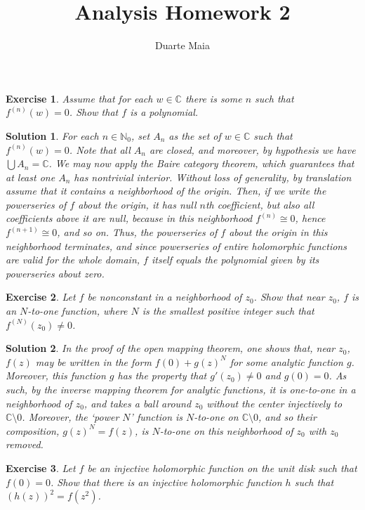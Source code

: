 \documentclass{article}
\title{Analysis Homework 2}
\author{Duarte Maia}
\newtheorem{ex}{Exercise}
\theoremstyle{nonumberplain}
\newtheorem{sol}{Solution}
\newcommand{\C}{\mathbb{C}}
\newcommand{\N}{\mathbb{N}}
\begin{document}
\maketitle

\begin{ex}
Assume that for each $w \in \C$ there is some $n$ such that $f^{(n)}(w) = 0$. Show that $f$ is a polynomial.
\end{ex}

\begin{sol}
For each $n \in \N_0$, set $A_n$ as the set of $w \in \C$ such that $f^{(n)}(w) = 0$. Note that all $A_n$ are closed, and moreover, by hypothesis we have $\bigcup A_n = \C$. We may now apply the Baire category theorem, which guarantees that at least one $A_n$ has nontrivial interior. Without loss of generality, by translation assume that it contains a neighborhood of the origin. Then, if we write the powerseries of $f$ about the origin, it has null $n$th coefficient, but also all coefficients above it are null, because in this neighborhood $f^{(n)} \cong 0$, hence $f^{(n+1)} \cong 0$, and so on. Thus, the powerseries of $f$ about the origin in this neighborhood terminates, and since powerseries of entire holomorphic functions are valid for the whole domain, $f$ itself equals the polynomial given by its powerseries about zero.
\end{sol}

\begin{ex}
Let $f$ be nonconstant in a neighborhood of $z_0$. Show that near $z_0$, $f$ is an $N$-to-one function, where $N$ is the smallest positive integer such that $f^{(N)}(z_0) \neq 0$.
\end{ex}

\begin{sol}
In the proof of the open mapping theorem, one shows that, near $z_0$, $f(z)$ may be written in the form $f(0) + g(z)^N$ for some analytic function $g$. Moreover, this function $g$ has the property that $g'(z_0) \neq 0$ and $g(0) = 0$. As such, by the inverse mapping theorem for analytic functions, it is one-to-one in a neighborhood of $z_0$, and takes a ball around $z_0$ without the center injectively to $\C \setminus 0$. Moreover, the `power $N$' function is $N$-to-one on $\C \setminus 0$, and so their composition, $g(z)^N = f(z)$, is $N$-to-one on this neighborhood of $z_0$ with $z_0$ removed.
\end{sol}

\begin{ex}
Let $f$ be an injective holomorphic function on the unit disk such that $f(0) = 0$. Show that there is an injective holomorphic function $h$ such that $(h(z))^2 = f(z^2)$.
\end{ex}
\end{document}
